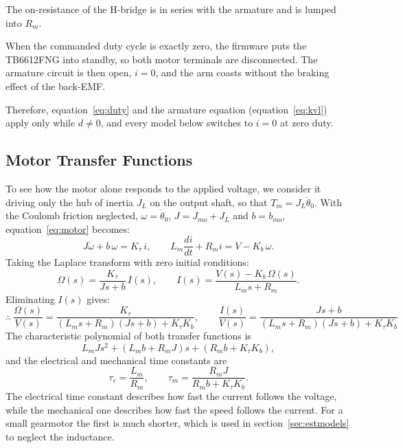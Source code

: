 \documentclass[a4paper,11pt]{article}
\begin{document}
The on-resistance of the H-bridge is in series with the armature and is lumped into $R_m$.

When the commanded duty cycle is exactly zero, the firmware puts the TB6612FNG into standby, so both motor terminals are disconnected. The armature circuit is then open, $i = 0$, and the arm coasts without the braking effect of the back-EMF.

Therefore, equation~\ref{eq:duty} and the armature equation (equation~\ref{eq:kvl}) apply only while $d \neq 0$, and every model below switches to $i = 0$ at zero duty.

\subsection{Motor Transfer Functions}
To see how the motor alone responds to the applied voltage, we consider it driving only the hub of inertia $J_L$ on the output shaft, so that $T_m = J_L \ddot\theta_0$. With the Coulomb friction neglected, $\omega = \dot\theta_0$, $J = J_{mo} + J_L$ and $b = b_{mo}$, equation~\ref{eq:motor} becomes:
\begin{equation}
  J \dot\omega + b\, \omega = K_\tau\, i, \qquad L_m \frac{di}{dt} + R_m i = V - K_b\, \omega .
\end{equation}
Taking the Laplace transform with zero initial conditions:
\begin{equation}
  \Omega(s) = \frac{K_\tau}{J s + b}\, I(s), \qquad I(s) = \frac{V(s) - K_b\, \Omega(s)}{L_m s + R_m} .
\end{equation}
Eliminating $I(s)$ gives:
\begin{equation}
\therefore\;\boxed{
  \frac{\Omega(s)}{V(s)} = \frac{K_\tau}{(L_m s + R_m)(J s + b) + K_\tau K_b}, \qquad
  \frac{I(s)}{V(s)} = \frac{J s + b}{(L_m s + R_m)(J s + b) + K_\tau K_b}
}
\label{eq:motorTF}
\end{equation}
The characteristic polynomial of both transfer functions is
\begin{equation}
  L_m J s^2 + \left(L_m b + R_m J\right)s + \left(R_m b + K_\tau K_b\right) ,
\end{equation}
and the electrical and mechanical time constants are
\begin{equation}
  \tau_e = \frac{L_m}{R_m}, \qquad \tau_m = \frac{R_m J}{R_m b + K_\tau K_b} .
  \label{eq:taus}
\end{equation}
The electrical time constant describes how fast the current follows the voltage, while the mechanical one describes how fast the speed follows the current. For a small gearmotor the first is much shorter, which is used in section~\ref{sec:estmodels} to neglect the inductance.
\end{document}
